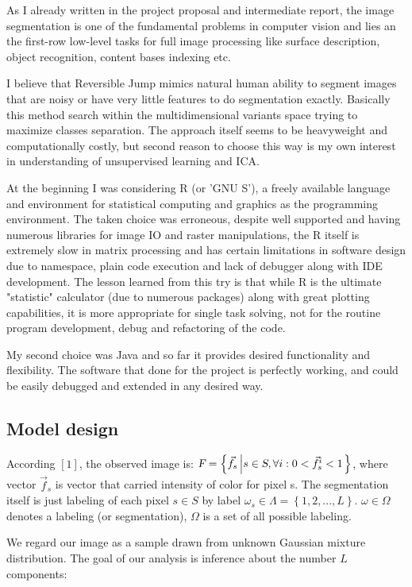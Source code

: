 \documentclass[journal]{IEEEtran}
\begin{document}
As I already written in the project proposal and intermediate report, the image segmentation is one of the fundamental problems in computer vision and lies an the first-row low-level tasks for full image processing like surface description, object recognition, content bases indexing etc. 

I believe that Reversible Jump mimics natural human ability to segment images that are noisy or have very little features to do segmentation exactly. Basically this method search within the multidimensional variants space trying to maximize classes separation. The approach itself seems to be heavyweight and computationally costly, but second reason to choose this way is my own interest in understanding of unsupervised learning and ICA. 

At the beginning I was considering R (or 'GNU S'), a freely available language and environment for statistical computing and graphics as the programming environment. The taken choice was erroneous, despite well supported and having numerous libraries for image IO and raster manipulations, the R itself is extremely slow in matrix processing and has certain limitations in software design due to namespace, plain code execution and lack of debugger along with IDE development. The lesson learned from this try is that while R is the ultimate "statistic" calculator (due to numerous packages) along with great plotting capabilities, it is more appropriate for single task solving, not for the routine program development, debug and refactoring of the code.

My second choice was Java and so far it provides desired functionality and flexibility. The software that done for the project is perfectly working, and could be easily debugged and extended in any desired way.

\subsection{Model design}
According $\left[1\right]$, the observed image is: $\textsl{F} = \left\{ \vec{f}_{s} \left| s \in \textsl{S}, \forall i : 0 < \vec{f}^{i}_{s} < 1 \right. \right\}$,
where vector $\vec{f}_{s}$ is vector that carried intensity of color for pixel s. The segmentation itself is just labeling of each pixel $s \in S$ by label $\omega_{s} \in \Lambda = \left\{ 1,2,...,L \right\}$. $\omega\in\Omega$ denotes a labeling (or segmentation), $\Omega$ is a set of all possible labeling.

We regard our image as a sample drawn from unknown Gaussian mixture distribution. The goal of our analysis is inference about the number 
$L$ components:
\end{document}
